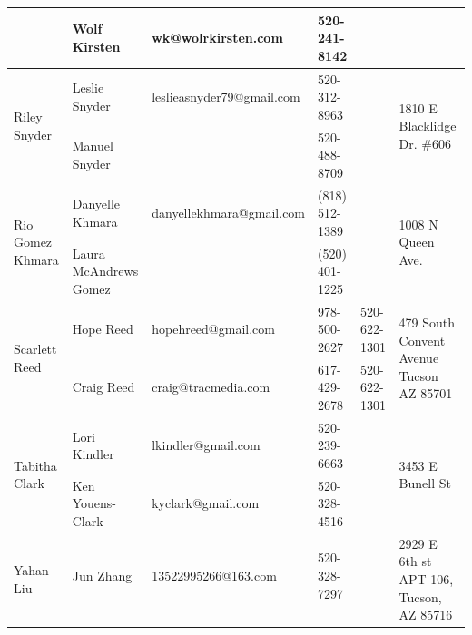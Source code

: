 \documentclass[landscape]{article}\usepackage[]{graphicx}\usepackage[]{color}
\begin{document}
\begin{longtable}{|p{100pt}|p{100pt}|p{140pt}|p{60pt}|p{64pt}|p{120pt}|}
 & Wolf Kirsten & wk@wolrkirsten.com & 520-241-8142 &  & \\
\hline
\multirow{2}{100pt}{Riley Snyder} & Leslie Snyder & leslieasnyder79@gmail.com & 520-312-8963 &  & \multirow{2}{120pt}{1810 E Blacklidge Dr. \#606} \\
 & Manuel Snyder &  & 520-488-8709 &  & \\
\hline
\multirow{2}{100pt}{Rio Gomez Khmara} & Danyelle Khmara & danyellekhmara@gmail.com & (818) 512-1389 &  & \multirow{2}{120pt}{1008 N Queen Ave.} \\
 & Laura McAndrews Gomez &  & (520) 401-1225 &  & \\
\hline
\multirow{2}{100pt}{Scarlett Reed} & Hope Reed & hopehreed@gmail.com & 978-500-2627 & 520-622-1301 & \multirow{2}{120pt}{479 South Convent Avenue Tucson AZ  85701} \\
 & Craig Reed & craig@tracmedia.com & 617-429-2678 & 520-622-1301 & \\
\hline
\multirow{2}{100pt}{Tabitha Clark} & Lori Kindler & lkindler@gmail.com & 520-239-6663 &  & \multirow{2}{120pt}{3453 E Bunell St} \\
 & Ken Youens-Clark & kyclark@gmail.com & 520-328-4516 &  & \\
\hline
\multirow{2}{100pt}{Yahan Liu} & Jun Zhang & 13522995266@163.com & 520-328-7297 &  & \multirow{2}{120pt}{2929 E 6th st APT 106, Tucson, AZ 85716} \\
 &  &  &  &  & \\
\hline
\end{longtable}
\newpage
\end{document}

